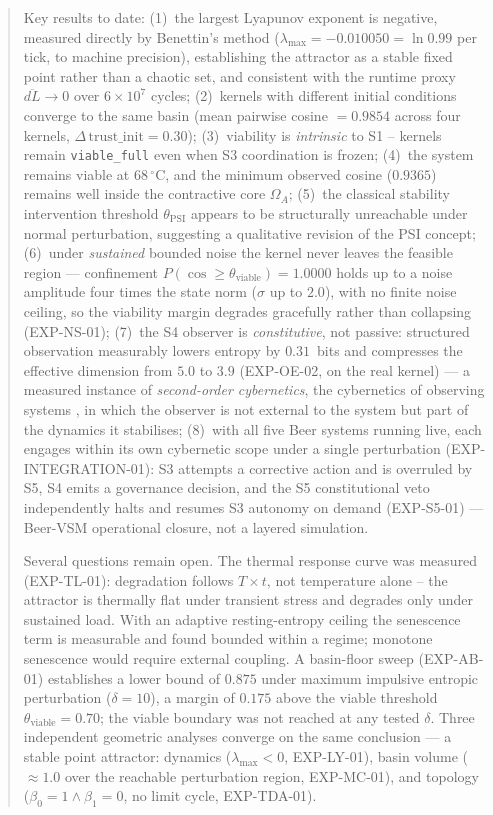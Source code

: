 \documentclass[11pt, a4paper]{article}
\begin{document}
\begin{abstract}
Key results to date:
(1)~the largest Lyapunov exponent is negative, measured directly by Benettin's
method ($\lambda_\text{max} = -0.010050 = \ln 0.99$ per tick, to machine
precision), establishing the attractor as a stable fixed point rather than a
chaotic set, and consistent with the runtime proxy $\overline{dL} \to 0$ over
$6 \times 10^7$ cycles;
(2)~kernels with different initial conditions converge to the same basin
(mean pairwise cosine $= 0.9854$ across four kernels, $\Delta\,\text{trust\_init} = 0.30$);
(3)~viability is \emph{intrinsic} to S1 -- kernels remain \texttt{viable\_full}
even when S3 coordination is frozen;
(4)~the system remains viable at $68\,^\circ\mathrm{C}$, and the minimum observed
cosine ($0.9365$) remains well inside the contractive core $\Omega_A$;
(5)~the classical stability intervention threshold $\theta_\text{PSI}$
appears to be structurally unreachable under normal perturbation,
suggesting a qualitative revision of the PSI concept;
(6)~under \emph{sustained} bounded noise the kernel never leaves the feasible
region --- confinement $P(\cos \ge \theta_\text{viable}) = 1.0000$ holds up to a
noise amplitude four times the state norm ($\sigma$ up to $2.0$), with no finite
noise ceiling, so the
viability margin degrades gracefully rather than collapsing (EXP-NS-01);
(7)~the S4 observer is \emph{constitutive}, not passive: structured observation
measurably lowers entropy by $0.31$~bits and compresses the effective dimension
from $5.0$ to $3.9$ (EXP-OE-02, on the real kernel) --- a measured instance of \emph{second-order
cybernetics}, the cybernetics of observing systems
\citep{vonfoerster1974cybernetics}, in which the observer is not external to the
system but part of the dynamics it stabilises;
(8)~with all five Beer systems running live, each engages within its own cybernetic
scope under a single perturbation (EXP-INTEGRATION-01): S3 attempts a corrective
action and is overruled by S5, S4 emits a governance decision, and the S5
constitutional veto independently halts and resumes S3 autonomy on demand
(EXP-S5-01) --- Beer-VSM operational closure, not a layered simulation.

Several questions remain open.
The thermal response curve was measured (EXP-TL-01): degradation follows
$T \times t$, not temperature alone -- the attractor is thermally flat under
transient stress and degrades only under sustained load.
With an adaptive resting-entropy ceiling the senescence term is measurable and
found bounded within a regime; monotone senescence would require external
coupling.
A basin-floor sweep (EXP-AB-01) establishes a lower bound of $0.875$
under maximum impulsive entropic perturbation ($\delta = 10$), a margin
of $0.175$ above the viable threshold $\theta_\text{viable} = 0.70$;
the viable boundary was not reached at any tested $\delta$.
Three independent geometric analyses converge on the same conclusion --- a
stable point attractor: dynamics ($\lambda_\text{max} < 0$, EXP-LY-01),
basin volume ($\approx 1.0$ over the reachable perturbation region, EXP-MC-01),
and topology ($\beta_0 = 1 \wedge \beta_1 = 0$, no limit cycle, EXP-TDA-01).


\end{abstract}
\end{document}
